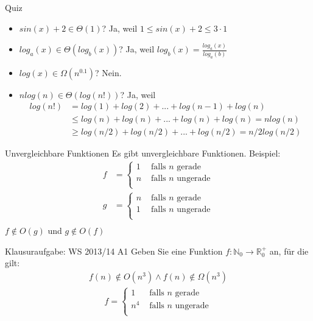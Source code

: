 \begin{frame}{Quiz}
  \begin{itemize}
    \item $sin(x)+2\in \Theta(1)$? \pause Ja, weil $1\leq sin(x)+2 \leq 3\cdot 1$
    \pause
    \item $log_a(x)\in \Theta(log_b(x))$? \pause Ja, weil $log_b(x)=\frac{log_a(x)}{log_a(b)}$
    \pause
    \item $log(x)\in\Omega (n^{0.1})$? \pause Nein.
    \pause
    \item $nlog(n) \in \Theta (log(n!))$? \pause Ja, weil
      \begin{align*}
        log(n!)&=log(1)+log(2)+ ... +log(n-1)+log(n)\\
        &\leq log(n) + log(n)+ ... + log(n)+ log(n)=nlog(n)\\
        &\geq log(n/2)+log(n/2)+ ... + log(n/2)=n/2log(n/2)
      \end{align*}
  \end{itemize}
\end{frame}

\begin{frame}{Unvergleichbare Funktionen}
  Es gibt unvergleichbare Funktionen. Beispiel:
  \begin{align*}
    f &=
    \begin{cases}
      1 & \text{ falls $n$ gerade} \\
      n & \text{ falls $n$ ungerade} \\
    \end{cases} \\
    g &=
    \begin{cases}
      n & \text{ falls $n$ gerade} \\
      1 & \text{ falls $n$ ungerade} \\
    \end{cases} \\
  \end{align*}
  $f \notin O(g)$ und $g \notin O(f)$
\end{frame}

\begin{frame}{Klausuraufgabe: WS 2013/14 A1}
  Geben Sie eine Funktion $f:\mathbb{N}_0\rightarrow \mathbb{R}_0^+$ an, für die gilt:
  \begin{align*}
    f(n)\notin O(n^3) \land f(n) \notin \Omega(n^3)
  \end{align*}
  \pause
 \begin{align*}
    f =
    \begin{cases}
      1 & \text{ falls $n$ gerade} \\
      n^4 & \text{ falls $n$ ungerade} \\
    \end{cases}
  \end{align*}
\end{frame}